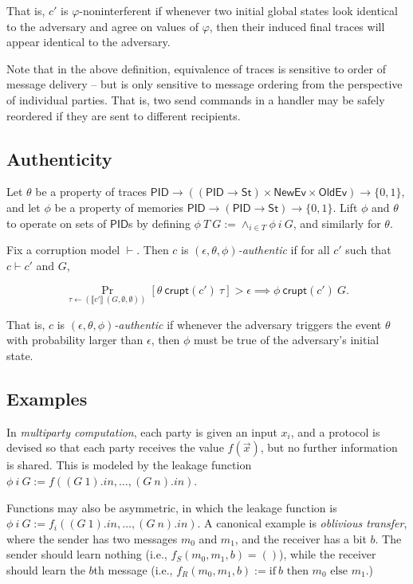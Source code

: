\documentclass{article}
\newcommand{\St}{\mathsf{St}}
\newcommand{\PID}{\mathsf{PID}}
\newcommand{\NewEv}{\mathsf{NewEv}}
\newcommand{\OldEv}{\mathsf{OldEv}}
\begin{document}
That is, $c'$ is $\varphi$-noninterferent  if whenever two initial global states look identical to the adversary and agree on values of $\varphi$, then their induced final traces will appear identical to the adversary. 

Note that in the above definition, equivalence of traces is sensitive to order of message delivery -- but is only sensitive to message ordering from the perspective of individual parties. That is, two send commands in a handler may be safely reordered if they are sent to different recipients.


\subsection{Authenticity}

Let $\theta$ be a property of traces $\PID \to ((\PID \to \St) \times \NewEv \times \OldEv) \to \{0,1\}$, and let $\phi$ be a property of memories $\PID \to (\PID \to \St) \to \{0,1\}$. Lift $\phi$ and $\theta$ to operate on sets of $\PID$s by defining $\phi\ T\ G := \wedge_{i \in T} \phi\ i\ G$, and similarly for $\theta$.

Fix a corruption model $\vdash$. Then $c$ is \emph{$(\epsilon, \theta, \phi)$-authentic} if for all $c'$ such that $c \vdash c'$ and $G$,

\[ \Pr_{\tau \leftarrow (\llbracket c' \rrbracket\ (G, \emptyset, \emptyset))}[\theta\ \mathsf{crupt}(c')\ \tau] > \epsilon \implies \phi\ \mathsf{crupt}(c')\ G.\]

That is, $c$ is \emph{$(\epsilon, \theta, \phi)$-authentic} if whenever the adversary triggers the event $\theta$ with probability larger than $\epsilon$, then $\phi$ must be true of the adversary's initial state.


\subsection{Examples}


In \emph{multiparty computation}, each party is given an input $x_i$, and a protocol is devised so that each party receives the value $f(\vec{x})$, but no further information is shared. This is modeled by the leakage function $\phi\ i\ G := f((G\ 1).in, \dots, (G\ n).in)$.

Functions may also be asymmetric, in which the leakage function is $\phi\ i\ G := f_i((G\ 1).in, \dots, (G\ n).in)$. A canonical example is \emph{oblivious transfer}, where the sender has two messages $m_0$ and $m_1$, and the receiver has a bit $b$. The sender should learn nothing (i.e., $f_S (m_0, m_1, b) = ()$), while the receiver should learn the $b$th message (i.e., $f_R (m_0, m_1, b) := \text{if}\ b \text{ then } m_0 \text{ else } m_1.$)
\end{document}
